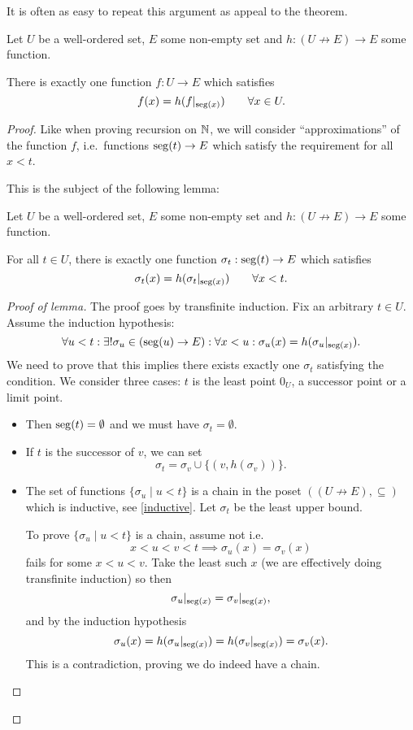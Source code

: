 It is often as easy to repeat this argument as appeal to the theorem.

\begin{theorem}
Let $U$ be a well-ordered set, $E$ some non-empty set and $h: (U\not\to E) \to E$ some function.

There is exactly one function $f:U\to E$ which satisfies
\[ f(x) = h(f|_{\operatorname{seg}(x)}) \qquad \forall x\in U. \]
\end{theorem}
\begin{proof}
Like when proving recursion on $\mathbb{N}$, we will consider ``approximations'' of the function $f$, i.e.\ functions $\operatorname{seg}(t) \to E$ which satisfy the requirement for all $x<t$.

This is the subject of the following lemma:
\begin{lemma*}
Let $U$ be a well-ordered set, $E$ some non-empty set and $h: (U\not\to E) \to E$ some function.

For all $t\in U$, there is exactly one function $\sigma_t:\operatorname{seg}(t)\to E$ which satisfies
\[ \sigma_t(x) = h(\sigma_t|_{\operatorname{seg}(x)}) \qquad \forall x < t. \]
\end{lemma*}
\begin{proof}[Proof of lemma] \renewcommand{\qedsymbol}{$\dashv$ (Lemma)}
The proof goes by transfinite induction. Fix an arbitrary $t\in U$. Assume the induction hypothesis:
\[ \forall u<t: \exists! \sigma_u\in (\operatorname{seg}(u)\to E): \forall x<u: \sigma_u(x) = h(\sigma_u|_{\operatorname{seg}(x)}). \]
We need to prove that this implies there exists exactly one $\sigma_t$ satisfying the condition. We consider three cases: $t$ is the least point $0_U$, a successor point or a limit point.
\begin{itemize}[leftmargin=2.5cm]
\item[\boxed{t = 0_U}] Then $\operatorname{seg}(t) = \emptyset$ and we must have $\sigma_t = \emptyset$.
\item[\boxed{t = S_U(v)}] If $t$ is the successor of $v$, we can set
\[ \sigma_t = \sigma_v\cup\{ (v,h(\sigma_v)) \}. \]
\item[\boxed{t\in \operatorname{Limit}(U)}] The set of functions $\{\sigma_u\;|\; u<t\}$ is a chain in the poset $((U\not\to E),\subseteq)$ which is inductive, see \ref{inductive}. Let $\sigma_t$ be the least upper bound.

To prove $\{\sigma_u\;|\; u<t\}$ is a chain, assume not i.e.\
\[ x<u<v<t \implies \sigma_u(x) = \sigma_v(x) \]
fails for some $x<u<v$. Take the least such $x$ (we are effectively doing transfinite induction) so then
\[ \sigma_u|_{\operatorname{seg}(x)} = \sigma_v|_{\operatorname{seg}(x)}, \]
and by the induction hypothesis
\[ \sigma_u(x) = h(\sigma_u|_{\operatorname{seg}(x)}) = h(\sigma_v|_{\operatorname{seg}(x)}) = \sigma_v(x). \]
This is a contradiction, proving we do indeed have a chain.


\end{itemize}
\end{proof}
\end{proof}
